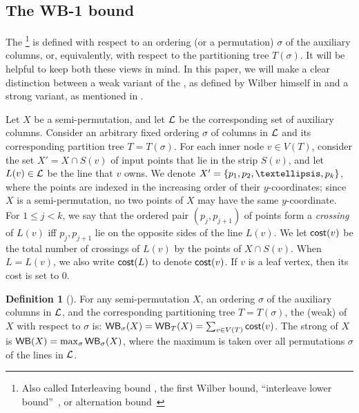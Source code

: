 \documentclass[11pt]{article}
\numberwithin{equation}{section}
\theoremstyle{definition}
\newtheorem{definition}[theorem]{Definition}
\theoremstyle{plain}
\begin{document}
%
%
%
%
%
%
%




%
%
%
\subsection{The WB-1 bound}\label{sec: WB def}
%
%


The \WBone\footnote{Also called Interleaving bound \cite{tango}, the first Wilber bound, ``interleave lower bound''~\cite{wilber}, or alternation bound~\cite{in_pursuit}} is defined with respect to an ordering (or a permutation) $\sigma$ of the auxiliary columns, or,  equivalently, with respect to the partitioning tree $T(\sigma)$. 
It will be helpful to keep both these views in mind. 
In this paper, we will make a clear distinction between a weak variant of the \WBone, as defined by Wilber himself in \cite{wilber} and a strong variant, as mentioned in \cite{in_pursuit}.  

Let $X$ be a semi-permutation, and let ${\mathcal L}$ be the corresponding set of auxiliary columns. 
Consider an arbitrary fixed ordering $\sigma$ of columns in ${\mathcal L}$ and its corresponding partition tree $T = T(\sigma)$.   
For each inner node $v \in V(T)$, consider the set $X' = X \cap S(v)$ of input points that lie in the strip $S(v)$, and let $L(v)\in {\mathcal L}$ be the line that $v$ owns.
We denote $X'=\set{p_1,p_2,\ldots,p_k}$, where the points are indexed in the increasing order of their $y$-coordinates; since $X$ is a semi-permutation, no two points of $X$ may have the same $y$-coordinate. 
For $1\leq j<k$, we say that the ordered pair $(p_j,p_{j+1})$ of points form a \emph{crossing} of $L(v)$ iff $p_j,p_{j+1}$ lie on the opposite sides of the line $L(v)$. 
We let $\mathsf{cost}(v)$ be the total number of crossings of $L(v)$ by the points of $X \cap S(v)$. When $L = L(v)$, we also write $\mathsf{cost}(L)$ to denote $\mathsf{cost}(v)$. If $v$ is a leaf vertex, then its cost is set to $0$.
%


\begin{definition}[\WBone] 
For any semi-permutation $X$, an ordering $\sigma$ of the auxiliary columns in ${\mathcal L}$, and the corresponding partitioning tree $T=T({\sigma})$,
the (weak) \WBone of $X$ with respect to $\sigma$ is: 
$\mathsf{WB}_{\sigma}(X) =  \mathsf{WB}_{T}(X) = \sum_{v \in V(T)} \mathsf{cost}(v)$.
The strong \WBone of $X$ is $\mathsf{WB}(X) = \max_{\sigma} \mathsf{WB}_{\sigma}(X)$, where the maximum is taken over all permutations $\sigma$ of the lines in ${\mathcal L}$.  
\end{definition} 
\end{document}
